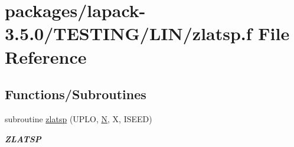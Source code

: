 \hypertarget{zlatsp_8f}{}\section{packages/lapack-\/3.5.0/\+T\+E\+S\+T\+I\+N\+G/\+L\+I\+N/zlatsp.f File Reference}
\label{zlatsp_8f}
\subsection*{Functions/\+Subroutines}
\begin{DoxyCompactItemize}
\item 
subroutine \hyperlink{group__complex16__lin_gaaa1d73e40a1923d773364071f0d868c6}{zlatsp} (U\+P\+L\+O, \hyperlink{polmisc_8c_a0240ac851181b84ac374872dc5434ee4}{N}, X, I\+S\+E\+E\+D)
\begin{DoxyCompactList}\small\item\em {\bfseries Z\+L\+A\+T\+S\+P} \end{DoxyCompactList}\end{DoxyCompactItemize}
